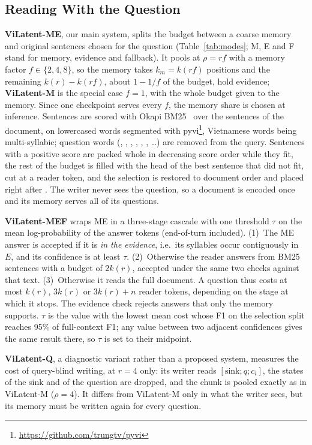 \subsection{Reading With the Question}
\label{sec:modes}
\textbf{ViLatent-ME}, our main system, splits the budget between a coarse memory and original sentences chosen for the question (Table~\ref{tab:modes}; M, E and F stand for memory, evidence and fallback).
It pools at $\rho = r f$ with a memory factor $f \in \{2,4,8\}$, so the memory takes $k_m = k(rf)$ positions and the remaining $k(r) - k(rf)$, about $1 - 1/f$ of the budget, hold evidence; \textbf{ViLatent-M} is the special case $f = 1$, with the whole budget given to the memory.
Since one checkpoint serves every $f$, the memory share is chosen at inference.
Sentences are scored with Okapi BM25~\cite{robertson2009bm25} over the sentences of the document, on lowercased words segmented with pyvi\footnote{\url{https://github.com/trungtv/pyvi}}, Vietnamese words being multi-syllabic; question words (, , , , , , \dots) are removed from the query.
Sentences with a positive score are packed whole in decreasing score order while they fit, the rest of the budget is filled with the head of the best sentence that did not fit, cut at a reader token, and the selection is restored to document order and placed right after \cmem{}.
The writer never sees the question, so a document is encoded once and its memory serves all of its questions.

\textbf{ViLatent-MEF} wraps ME in a three-stage cascade with one threshold $\tau$ on the mean log-probability of the answer tokens (end-of-turn included).
(1)~The ME answer is accepted if it is \emph{in the evidence}, i.e.\ its syllables occur contiguously in $E$, and its confidence is at least $\tau$.
(2)~Otherwise the reader answers from BM25 sentences with a budget of $2k(r)$, accepted under the same two checks against that text.
(3)~Otherwise it reads the full document.
A question thus costs at most $k(r)$, $3k(r)$ or $3k(r) + n$ reader tokens, depending on the stage at which it stops.
The evidence check rejects answers that only the memory supports.
$\tau$ is the value with the lowest mean cost whose F1 on the selection split reaches 95\% of full-context F1; any value between two adjacent confidences gives the same result there, so $\tau$ is set to their midpoint.

\textbf{ViLatent-Q}, a diagnostic variant rather than a proposed system, measures the cost of query-blind writing, at $r = 4$ only: its writer reads $[\text{sink}; q; c_i]$, the states of the sink and of the question are dropped, and the chunk is pooled exactly as in ViLatent-M ($\rho = 4$).
It differs from ViLatent-M only in what the writer sees, but its memory must be written again for every question.

